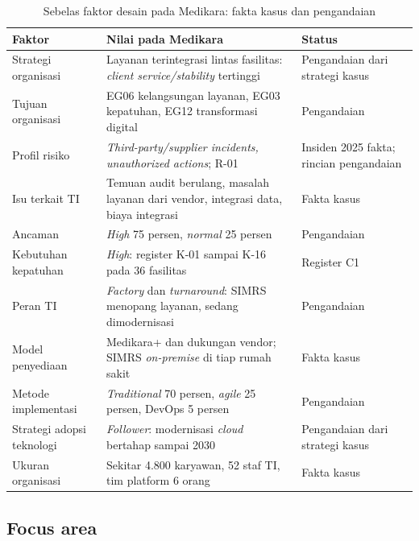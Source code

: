 \begin{table}[!htb]
  \centering\footnotesize
  \caption{Sebelas faktor desain pada Medikara: fakta kasus dan pengandaian}\label{tab:ch04-faktor-medikara}
  \begin{tabularx}{\textwidth}{|>{\raggedright\arraybackslash}p{}|>{\raggedright\arraybackslash}X|>{\raggedright\arraybackslash}p{}|}
    \hline
    \textbf{Faktor} & \textbf{Nilai pada Medikara} & \textbf{Status} \\ \hline
    Strategi organisasi & Layanan terintegrasi lintas fasilitas: \textit{client service/stability} tertinggi
    & Pengandaian dari strategi kasus \\ \hline
    Tujuan organisasi & EG06 kelangsungan layanan, EG03 kepatuhan, EG12 transformasi digital & Pengandaian \\
    \hline
    Profil risiko & \textit{Third-party/supplier incidents, unauthorized actions}; R-01 & Insiden 2025 fakta;
    rincian pengandaian \\ \hline
    Isu terkait TI & Temuan audit berulang, masalah layanan dari vendor, integrasi data, biaya integrasi & Fakta
    kasus \\ \hline
    Ancaman & \textit{High} 75 persen, \textit{normal} 25 persen & Pengandaian \\ \hline
    Kebutuhan kepatuhan & \textit{High}: register K-01 sampai K-16 pada 36 fasilitas & Register C1 \\ \hline
    Peran TI & \textit{Factory} dan \textit{turnaround}: SIMRS menopang layanan, sedang dimodernisasi & Pengandaian
    \\ \hline
    Model penyediaan & Medikara+ dan dukungan vendor; SIMRS \textit{on-premise} di tiap rumah sakit & Fakta kasus \\
    \hline
    Metode implementasi & \textit{Traditional} 70 persen, \textit{agile} 25 persen, DevOps 5 persen &
    Pengandaian \\ \hline
    Strategi adopsi teknologi & \textit{Follower}: modernisasi \textit{cloud} bertahap sampai 2030 & Pengandaian
    dari strategi kasus \\ \hline
    Ukuran organisasi & Sekitar 4.800 karyawan, 52 staf TI, tim platform 6 orang & Fakta kasus \\ \hline
  \end{tabularx}
\end{table}

\subsection*{Focus area}

